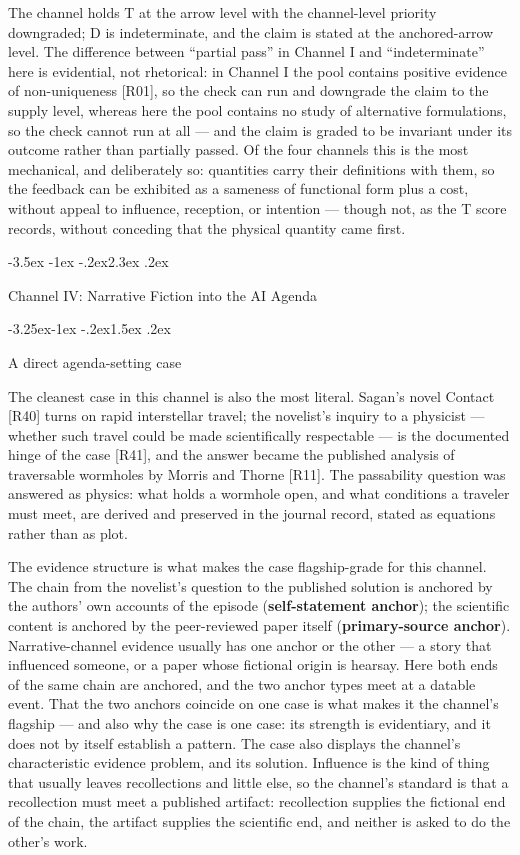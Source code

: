 \documentclass[11pt,a4paper]{article}
\makeatletter
\renewcommand\section{\@startsection{section}{1}{\z@}%
  {-3.5ex \@plus -1ex \@minus -.2ex}{2.3ex \@plus .2ex}%
  {\normalfont\Large\bfseries\raggedright}}
\renewcommand\subsection{\@startsection{subsection}{2}{\z@}%
  {-3.25ex\@plus -1ex \@minus -.2ex}{1.5ex \@plus .2ex}%
  {\normalfont\large\bfseries\raggedright}}
\makeatother
\begin{document}
The channel holds T at the arrow level with the channel-level priority downgraded; D is indeterminate, and the claim is stated at the anchored-arrow level. The difference between ``partial pass'' in Channel I and ``indeterminate'' here is evidential, not rhetorical: in Channel I the pool contains positive evidence of non-uniqueness [R01], so the check can run and downgrade the claim to the supply level, whereas here the pool contains no study of alternative formulations, so the check cannot run at all — and the claim is graded to be invariant under its outcome rather than partially passed. Of the four channels this is the most mechanical, and deliberately so: quantities carry their definitions with them, so the feedback can be exhibited as a sameness of functional form plus a cost, without appeal to influence, reception, or intention — though not, as the T score records, without conceding that the physical quantity came first.

\section{Channel IV: Narrative Fiction into the AI Agenda}

\subsection{A direct agenda-setting case}

The cleanest case in this channel is also the most literal. Sagan's novel Contact [R40] turns on rapid interstellar travel; the novelist's inquiry to a physicist — whether such travel could be made scientifically respectable — is the documented hinge of the case [R41], and the answer became the published analysis of traversable wormholes by Morris and Thorne [R11]. The passability question was answered as physics: what holds a wormhole open, and what conditions a traveler must meet, are derived and preserved in the journal record, stated as equations rather than as plot.

The evidence structure is what makes the case flagship-grade for this channel. The chain from the novelist's question to the published solution is anchored by the authors' own accounts of the episode (\textbf{self-statement anchor}); the scientific content is anchored by the peer-reviewed paper itself (\textbf{primary-source anchor}). Narrative-channel evidence usually has one anchor or the other — a story that influenced someone, or a paper whose fictional origin is hearsay. Here both ends of the same chain are anchored, and the two anchor types meet at a datable event. That the two anchors coincide on one case is what makes it the channel's flagship — and also why the case is one case: its strength is evidentiary, and it does not by itself establish a pattern. The case also displays the channel's characteristic evidence problem, and its solution. Influence is the kind of thing that usually leaves recollections and little else, so the channel's standard is that a recollection must meet a published artifact: recollection supplies the fictional end of the chain, the artifact supplies the scientific end, and neither is asked to do the other's work.
\end{document}
